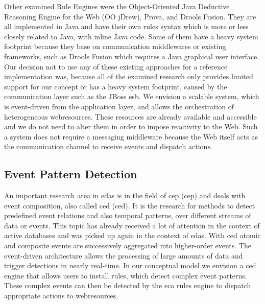 Other examined Rule Engines were the \textrm{Object-Oriented Java Deductive Reasoning Engine for the Web} (\textrm{OO jDrew}), \textrm{Prova}, and \textrm{Drools Fusion}.
They are all implemented in \textrm{Java} and have their own rules syntax which is more or less closely related to \textrm{Java}, with inline \textrm{Java} code.
Some of them have a heavy system footprint because they base on communication middlewares or existing frameworks, such as \textrm{Drools Fusion} which requires a Java graphical user interface.
Our decision not to use any of these existing approaches for a reference implementation was, because all of the examined research only provides limited support for our concept or has a heavy system footprint, caused by the communication layer such as the \textrm{JBoss \acrshort{esb}}.
We envision a scalable system, which is event-driven from the application layer, and allows the orchestration of heterogeneous \glspl{webresource}.
These resources are already available and accessible and we do not need to alter them in order to impose reactivity to the Web.
Such a system does not require a messaging middleware because the Web itself acts as the communication channel to receive events and dispatch actions.


\subsection{Event Pattern Detection}
An important research area in \textrm{\acrlong{eda}s} is in the field of \textrm{\acrlong{cep} (\acrshort{cep})}\cite{anicic2010arlfcepar} and deals with event composition, also called \textrm{\acrlong{ced} (\acrshort{ced})}\cite{akdere2008plan}\cite{2004_1265833}.
It is the research for methods to detect predefined event relations and also temporal patterns, over different streams of data or events.
This topic has already received a lot of attention in the context of active databases\cite{Gehani92compositeevent}\cite{Zimmer99onthe} and was picked up again in the context of \textrm{\acrlong{eda}s}.
With \textrm{\acrshort{ced}} atomic and composite events are successively aggregated into higher-order events.
The event-driven architecture allows the processing of large amounts of data and trigger detections in nearly real-time.
In our conceptual model we envision a \textrm{\acrshort{ced}} engine that allows users to install rules, which detect complex event patterns.
These complex events can then be detected by the \textrm{\acrshort{eca}} rules engine to dispatch appropriate actions to \textrm{\glspl{webresource}}.

